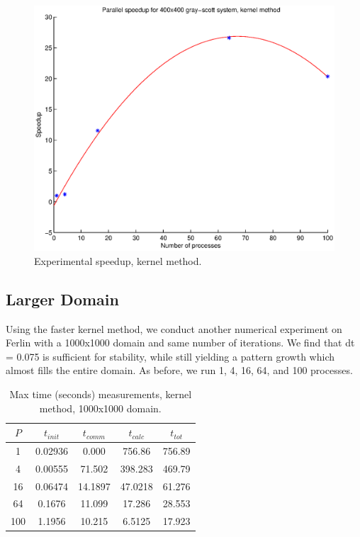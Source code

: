 \documentclass[a4paper,11pt]{article}
\begin{document}
\begin{figure}
  \centering
  \includegraphics[scale=0.6]{kernel}
    \caption{Experimental speedup, kernel method.}
    \label{fig:kernel}
\end{figure}

\subsection*{Larger Domain}
Using the faster kernel method, we conduct another numerical experiment on Ferlin with a 1000x1000 domain and same number of iterations. We find that dt = 0.075 is sufficient for stability, while still yielding a pattern growth which almost fills the entire domain. As before, we run 1, 4, 16, 64, and 100 processes. 

\begin{table}[h]
\def\arraystretch{1.2}
\begin{center}
\caption{Max time (seconds) measurements, kernel method, 1000x1000 domain.}
\label{tab:matrix}
\begin{tabular}{| c | c | c | c | c |}
\hline
$P$ & $t_{init}$ & $t_{comm}$ & $t_{calc}$ & $t_{tot}$ \\
\hline
1 & 0.02936 &  0.000 & 756.86 & 756.89\\
\hline
4 & 0.00555 & 71.502 & 398.283 & 469.79\\
\hline
16 & 0.06474 & 14.1897 & 47.0218 & 61.276\\
\hline
64 & 0.1676 & 11.099 & 17.286 & 28.553\\
\hline
100 & 1.1956 & 10.215 & 6.5125 & 17.923\\
\hline
\end{tabular}
\end{center}
\end{table}
\end{document}
